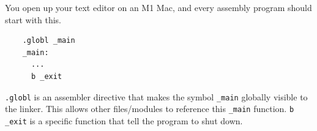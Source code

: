   You open up your text editor on an M1 Mac, and every assembly program should start with this. 

  \begin{lstlisting}
    .globl _main
    _main:
      ...
      b _exit
  \end{lstlisting}
  
  \texttt{.globl} is an assembler directive that makes the symbol \texttt{\_main} globally visible to the linker. This allows other files/modules to reference this \texttt{\_main} function. \texttt{b \_exit} is a specific function that tell the program to shut down. 

